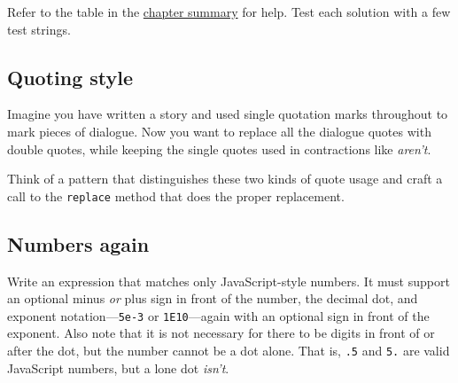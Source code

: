 Refer to the table in the \hyperref[regexp.summary_regexp]{chapter summary} for help. Test each solution with a few test strings.

\subsection{Quoting style}

Imagine you have written a story and used single quotation marks throughout to mark pieces of dialogue. Now you want to replace all the dialogue quotes with double quotes, while keeping the single quotes used in contractions like \emph{aren't}.

Think of a pattern that distinguishes these two kinds of quote usage and craft a call to the \lstinline`replace` method that does the proper replacement.

\subsection{Numbers again}

Write an expression that matches only JavaScript-style numbers. It must support an optional minus \emph{or} plus sign in front of the number, the decimal dot, and exponent notation—\lstinline`5e-3` or \lstinline`1E10`—again with an optional sign in front of the exponent. Also note that it is not necessary for there to be digits in front of or after the dot, but the number cannot be a dot alone. That is, \lstinline`.5` and \lstinline`5.` are valid JavaScript numbers, but a lone dot \emph{isn't}.
